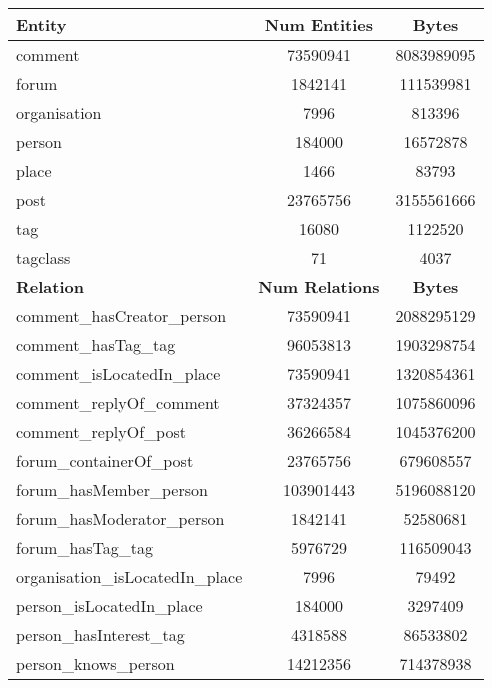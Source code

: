 \begin{table}[H]
    \centering
    \begin{tabular} {| l | c | c |}
        \hline
        \textbf{Entity} & \textbf{Num Entities} & \textbf{Bytes} \\
        \hline
        \hline
        comment & 73590941 & 8083989095 \\
        \hline
        forum & 1842141 & 111539981 \\
        \hline
        organisation & 7996 & 813396 \\
        \hline
        person & 184000 & 16572878 \\
        \hline
        place & 1466 & 83793 \\
        \hline
        post & 23765756 & 3155561666 \\
        \hline
        tag & 16080 & 1122520 \\
        \hline
        tagclass & 71 & 4037 \\
        \hline
        \hline
        \textbf{Relation} & \textbf{Num Relations} & \textbf{Bytes} \\
        \hline
        \hline
        comment\_hasCreator\_person & 73590941 & 2088295129 \\
        \hline
        comment\_hasTag\_tag & 96053813 & 1903298754 \\
        \hline
        comment\_isLocatedIn\_place & 73590941 & 1320854361 \\
        \hline
        comment\_replyOf\_comment & 37324357 & 1075860096 \\
        \hline
        comment\_replyOf\_post & 36266584 & 1045376200 \\
        \hline
        forum\_containerOf\_post & 23765756 & 679608557 \\
        \hline
        forum\_hasMember\_person & 103901443 & 5196088120 \\
        \hline
        forum\_hasModerator\_person & 1842141 & 52580681 \\
        \hline
        forum\_hasTag\_tag & 5976729 & 116509043 \\
        \hline
        organisation\_isLocatedIn\_place & 7996 & 79492 \\
        \hline
        person\_isLocatedIn\_place & 184000 & 3297409 \\
        \hline
        person\_hasInterest\_tag & 4318588 & 86533802 \\
        \hline
        person\_knows\_person & 14212356 & 714378938 \\

\end{tabular}
\end{table}
